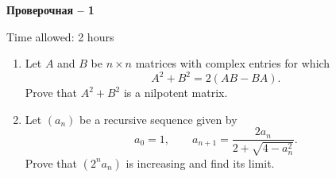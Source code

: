 \documentclass[11pt,a4paper]{article}
\begin{document}
\begin{center}
{\huge\bfseries\foreignlanguage{russian}{Проверочная} -- 1\par}\vspace{0.8em}
{\large Time allowed: 2 hours\par}
\end{center}
\vspace{1em}

\begin{enumerate}[leftmargin=2.2em,itemsep=1.2em]
\item Let $A$ and $B$ be $n\times n$ matrices with complex entries for which
\[
A^2+B^2=2(AB-BA).
\]
Prove that $A^2+B^2$ is a nilpotent matrix.

\item Let $(a_n)$ be a recursive sequence given by
\[
a_0=1,\qquad a_{n+1}=\frac{2a_n}{2+\sqrt{4-a_n^2}}.
\]
Prove that $(2^na_n)$ is increasing and find its limit.
\end{enumerate}
\end{document}
